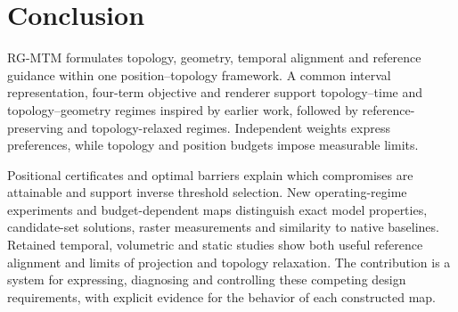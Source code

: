 \section{Conclusion}\label{sec:conclusion}
RG-MTM formulates topology, geometry, temporal alignment and reference guidance within one position--topology framework. A common interval representation, four-term objective and renderer support topology--time and topology--geometry regimes inspired by earlier work, followed by reference-preserving and topology-relaxed regimes. Independent weights express preferences, while topology and position budgets impose measurable limits.

Positional certificates and optimal barriers explain which compromises are attainable and support inverse threshold selection. New operating-regime experiments and budget-dependent maps distinguish exact model properties, candidate-set solutions, raster measurements and similarity to native baselines. Retained temporal, volumetric and static studies show both useful reference alignment and limits of projection and topology relaxation. The contribution is a system for expressing, diagnosing and controlling these competing design requirements, with explicit evidence for the behavior of each constructed map.
